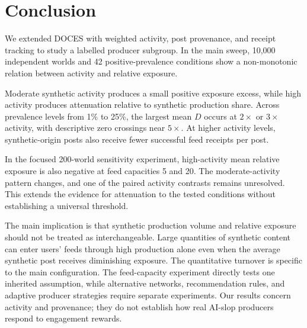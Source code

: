 \documentclass[runningheads]{llncs}
\begin{document}
\section{Conclusion}

We extended DOCES with weighted activity, post provenance, and receipt tracking to study a labelled producer subgroup. In the main sweep, 10,000 independent worlds and 42 positive-prevalence conditions show a non-monotonic relation between activity and relative exposure.

Moderate synthetic activity produces a small positive exposure excess, while high activity produces attenuation relative to synthetic production share. Across prevalence levels from 1\% to 25\%, the largest mean \(D\) occurs at \(2\times\) or \(3\times\) activity, with descriptive zero crossings near \(5\times\). At higher activity levels, synthetic-origin posts also receive fewer successful feed receipts per post.

In the focused 200-world sensitivity experiment, high-activity mean relative exposure is also negative at feed capacities 5 and 20. The moderate-activity pattern changes, and one of the paired activity contrasts remains unresolved. This extends the evidence for attenuation to the tested conditions without establishing a universal threshold.

The main implication is that synthetic production volume and relative exposure should not be treated as interchangeable. Large quantities of synthetic content can enter users' feeds through high production alone even when the average synthetic post receives diminishing exposure. The quantitative turnover is specific to the main configuration. The feed-capacity experiment directly tests one inherited assumption, while alternative networks, recommendation rules, and adaptive producer strategies require separate experiments. Our results concern activity and provenance; they do not establish how real AI-slop producers respond to engagement rewards.



%
\end{document}
